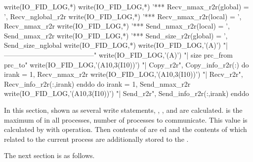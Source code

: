 \begin{LstF90}[name=COMM_sortdest,firstnumber=last]
  write(IO_FID_LOG,*)
  write(IO_FID_LOG,*) '*** Recv_nmax_r2r(global) = ', Recv_nglobal_r2r
  write(IO_FID_LOG,*) '*** Recv_nmax_r2r(local)  = ', Recv_nmax_r2r
  write(IO_FID_LOG,*) '*** Send_nmax_r2r(local)  = ', Send_nmax_r2r
  write(IO_FID_LOG,*) '*** Send_size_r2r(global) = ', Send_size_nglobal
  write(IO_FID_LOG,*)
  write(IO_FID_LOG,'(A)')             "|---------------------------------------"
  write(IO_FID_LOG,'(A)')             "|               size  prc_from    prc_to"
  write(IO_FID_LOG,'(A10,3(I10))')    "| Copy_r2r", Copy_info_r2r(:)
  do irank = 1, Recv_nmax_r2r
     write(IO_FID_LOG,'(A10,3(I10))') "| Recv_r2r", Recv_info_r2r(:,irank)
  enddo
  do irank = 1, Send_nmax_r2r
     write(IO_FID_LOG,'(A10,3(I10))') "| Send_r2r", Send_info_r2r(:,irank)
  enddo

\end{LstF90}
%
In this section, shown as several write statements,
, ,  and
 are calculated.
%
 is the maximum of  in all
processes, number of processes to communicate.
%
This value is calculated by  with 
operation.
%
Then contents of  are ed and the
contents of  which related to the current process are
additionally stored to the .


The next section is as follows.

